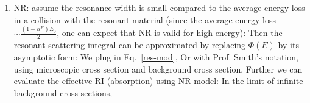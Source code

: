 \documentclass{school-22.211-notes}
\begin{document}
\begin{enumerate}
\item NR: assume the resonance width is small compared to the average energy loss in a collision with the resonant material (since the average energy loss $\sim \frac{(1-\alpha^R)E_0}{2}$, one can expect that NR is valid for high energy): 
  Then the resonant scattering integral can be approximated by replacing $\Phi(E)$ by its asymptotic form: 
  We plug in Eq.~\ref{res-mod}, 
  Or with Prof. Smith's notation, using microscopic cross section and background cross section, 
Further we can evaluate the effective RI (absorption) using NR model: 
In the limit of infinite background cross sections, 



\end{enumerate}
\end{document}
